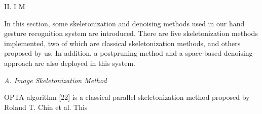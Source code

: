 \documentclass{article}
\begin{document}
\begin{multicols}{2}
\begin{minipage}[t]{0.48\textwidth}
\begin{center}
\fontsize{9}{7}\selectfont \textsc{II. I} \textsc{M}
\end{center}

\hspace{0.2cm}In this section, some skeletonization and denoising methods used in our hand gesture recognition system are introduced. There are five skeletonization methods implemented, two of which are classical skeletonization methods, and others proposed by us. In addition, a postpruning method and a space-based denoising approach are also deployed in this system.

\begin{flushleft}
\textit{A. Image Skeletonization Method}
\end{flushleft}

\hspace{0.2cm}OPTA algorithm [22] is a classical parallel skeletonization method proposed by Roland T. Chin et al. This

\end {minipage}
\end{multicols}
\end{document}
